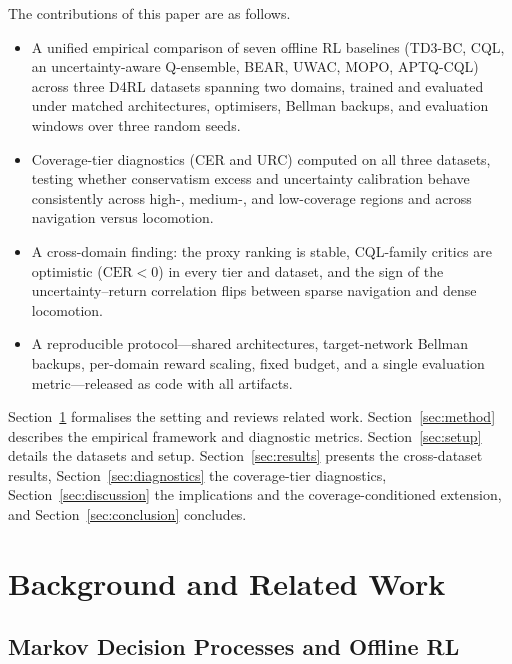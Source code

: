 \documentclass[conference]{IEEEtran}
\begin{document}
The contributions of this paper are as follows.
\begin{itemize}[leftmargin=1.5em,itemsep=2pt]
  \item A unified empirical comparison of seven offline RL baselines
    (TD3-BC, CQL, an uncertainty-aware Q-ensemble, BEAR, UWAC, MOPO,
    APTQ-CQL) across three D4RL datasets spanning two domains, trained and
    evaluated under matched architectures, optimisers, Bellman backups, and
    evaluation windows over three random seeds.
  \item Coverage-tier diagnostics (CER and URC) computed on all three
    datasets, testing whether conservatism excess and uncertainty calibration
    behave consistently across high-, medium-, and low-coverage regions and
    across navigation versus locomotion.
  \item A cross-domain finding: the proxy ranking is stable, CQL-family
    critics are optimistic ($\mathrm{CER}{<}0$) in every tier and dataset,
    and the sign of the uncertainty--return correlation flips between sparse
    navigation and dense locomotion.
  \item A reproducible protocol---shared architectures, target-network
    Bellman backups, per-domain reward scaling, fixed budget, and a single
    evaluation metric---released as code with all artifacts.
\end{itemize}

Section~\ref{sec:background} formalises the setting and reviews related
work. Section~\ref{sec:method} describes the empirical framework and
diagnostic metrics. Section~\ref{sec:setup} details the datasets and setup.
Section~\ref{sec:results} presents the cross-dataset results,
Section~\ref{sec:diagnostics} the coverage-tier diagnostics,
Section~\ref{sec:discussion} the implications and the coverage-conditioned
extension, and Section~\ref{sec:conclusion} concludes.

\section{Background and Related Work}
\label{sec:background}

\subsection{Markov Decision Processes and Offline RL}
\end{document}
